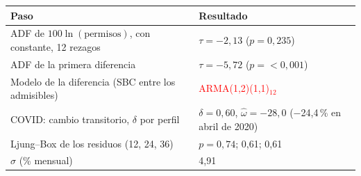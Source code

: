 \begin{tabular}{ll}
\toprule
Paso & Resultado
\\ \midrule
ADF de $100\ln(\text{permisos})$, con constante, 12 rezagos & $\tau=\ensuremath{-}2{,}13$ ($p=0{,}235$) \\
ADF de la primera diferencia & $\tau=\ensuremath{-}5{,}72$ ($p=\ensuremath{<0{,}001}$) \\
Modelo de la diferencia (SBC entre los admisibles) & \textcolor{red}{ARMA(1,2)(1,1)\ensuremath{_{12}}} \\
COVID: cambio transitorio, $\delta$ por perfil & $\delta=0{,}60$, $\hat\omega=\ensuremath{-}28{,}0$ (\ensuremath{-}24{,}4\,\% en abril de 2020) \\
Ljung--Box de los residuos (12, 24, 36) & $p=0{,}74$; 0{,}61; 0{,}61 \\
$\hat\sigma$ (\% mensual) & 4{,}91 \\
\bottomrule
\end{tabular}
